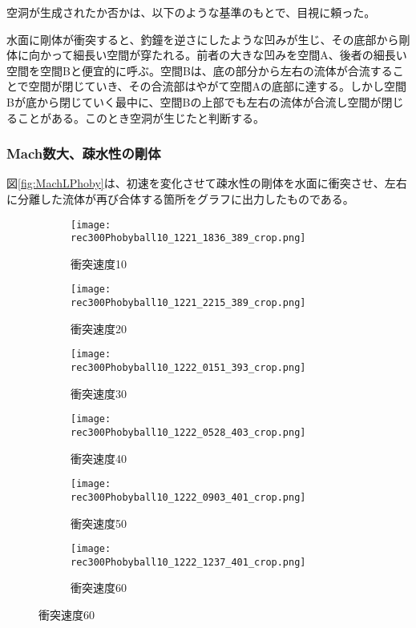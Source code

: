 \documentclass[]{jsarticle}
\begin{document}
空洞が生成されたか否かは、以下のような基準のもとで、目視に頼った。

水面に剛体が衝突すると、釣鐘を逆さにしたような凹みが生じ、その底部から剛体に向かって細長い空間が穿たれる。前者の大きな凹みを空間A、後者の細長い空間を空間Bと便宜的に呼ぶ。空間Bは、底の部分から左右の流体が合流することで空間が閉じていき、その合流部はやがて空間Aの底部に達する。しかし空間Bが底から閉じていく最中に、空間Bの上部でも左右の流体が合流し空間が閉じることがある。このとき空洞が生じたと判断する。
\subsubsection{Mach数大、疎水性の剛体}
\label{subsec:MLPhoby}
図\ref{fig:MachLPhoby}は、初速を変化させて疎水性の剛体を水面に衝突させ、左右に分離した流体が再び合体する箇所をグラフに出力したものである。
\begin{figure}[H]
  \centering
\begin{subfigure}{0.3\columnwidth}
  \centering
  \texttt{[image: rec300Phobyball10\_1221\_1836\_389\_crop.png]}
  \caption{衝突速度10}
  \label{fig:vel10}
\end{subfigure}
\begin{subfigure}{0.3\columnwidth}
  \centering
  \texttt{[image: rec300Phobyball10\_1221\_2215\_389\_crop.png]}
  \caption{衝突速度20}
  \label{fig:vel20}
\end{subfigure}
\begin{subfigure}{0.3\columnwidth}
  \centering
  \texttt{[image: rec300Phobyball10\_1222\_0151\_393\_crop.png]}
  \caption{衝突速度30}
  \label{fig:vel30}
\end{subfigure}
\begin{subfigure}{0.3\columnwidth}
  \centering
  \texttt{[image: rec300Phobyball10\_1222\_0528\_403\_crop.png]}
  \caption{衝突速度40}
  \label{fig:vel40}
\end{subfigure}
\begin{subfigure}{0.3\columnwidth}
  \centering
  \texttt{[image: rec300Phobyball10\_1222\_0903\_401\_crop.png]}
  \caption{衝突速度50}
  \label{fig:vel50}
\end{subfigure}
\begin{subfigure}{0.3\columnwidth}
  \centering
  \texttt{[image: rec300Phobyball10\_1222\_1237\_401\_crop.png]}
  \caption{衝突速度60}
  \label{fig:vel60}
\end{subfigure}
\end{figure}
\end{document}
